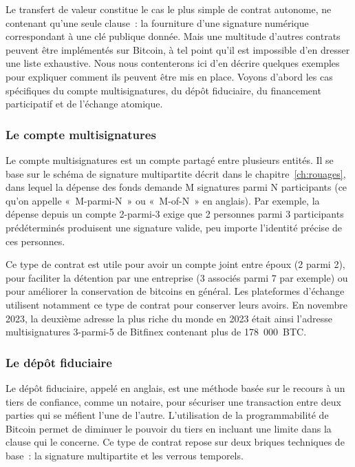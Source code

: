 Le transfert de valeur constitue le cas le plus simple de contrat autonome, ne contenant qu'une seule clause~: la fourniture d'une signature numérique correspondant à une clé publique donnée. Mais une multitude d'autres contrats peuvent être implémentés sur Bitcoin, à tel point qu'il est impossible d'en dresser une liste exhaustive. Nous nous contenterons ici d'en décrire quelques exemples pour expliquer comment ils peuvent être mis en place. Voyons d'abord les cas spécifiques du compte multisignatures, du dépôt fiduciaire, du financement participatif et de l'échange atomique.


\subsubsection*{Le compte multisignatures} Le compte multisignatures est un compte partagé entre plusieurs entités. Il se base sur le schéma de signature multipartite décrit dans le chapitre~\ref{ch:rouages}, dans lequel la dépense des fonds demande M signatures parmi N participants (ce qu'on appelle «~M-parmi-N~» ou «~M-of-N~» en anglais). Par exemple, la dépense depuis un compte 2-parmi-3 exige que 2 personnes parmi 3 participants prédéterminés produisent une signature valide, peu importe l'identité précise de ces personnes.

Ce type de contrat est utile pour avoir un compte joint entre époux (2 parmi 2), pour faciliter la détention par une entreprise (3 associés parmi 7 par exemple) ou pour améliorer la conservation de bitcoins en général. Les plateformes d'échange utilisent notamment ce type de contrat pour conserver leurs avoirs. En novembre 2023, la deuxième adresse la plus riche du monde en 2023 était ainsi l'adresse multisignatures 3-parmi-5 de Bitfinex contenant plus de 178~000~BTC.


\subsubsection*{Le dépôt fiduciaire} Le dépôt fiduciaire, appelé  en anglais, est une méthode basée sur le recours à un tiers de confiance, comme un notaire, pour sécuriser une transaction entre deux parties qui se méfient l'une de l'autre. L'utilisation de la programmabilité de Bitcoin permet de diminuer le pouvoir du tiers en incluant une limite dans la clause qui le concerne. Ce type de contrat repose sur deux briques techniques de base~: la signature multipartite et les verrous temporels.

